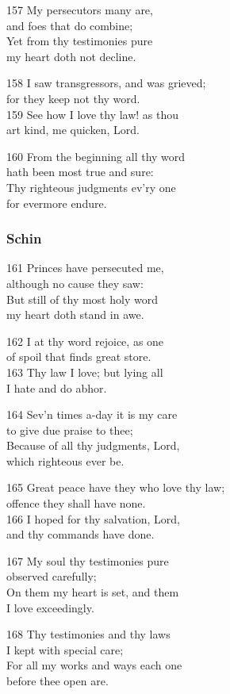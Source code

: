 157 My persecutors many are,\\
and foes that do combine;\\
Yet from thy testimonies pure\\
my heart doth not decline.

158 I saw transgressors, and was grieved;\\
for they keep not thy word.\\
159 See how I love thy law! as thou\\
art kind, me quicken, Lord.

160 From the beginning all thy word\\
hath been most true and sure:\\
Thy righteous judgments ev’ry one\\
for evermore endure.

\subsubsection*{Schin}

161 Princes have persecuted me,\\
although no cause they saw:\\
But still of thy most holy word\\
my heart doth stand in awe.

162 I at thy word rejoice, as one\\
of spoil that finds great store.\\
163 Thy law I love; but lying all\\
I hate and do abhor.

164 Sev’n times a-day it is my care\\
to give due praise to thee;\\
Because of all thy judgments, Lord,\\
which righteous ever be.

165 Great peace have they who love thy law;\\
offence they shall have none.\\
166 I hoped for thy salvation, Lord,\\
and thy commands have done.

167 My soul thy testimonies pure\\
observed carefully;\\
On them my heart is set, and them\\
I love exceedingly.

168 Thy testimonies and thy laws\\
I kept with special care;\\
For all my works and ways each one\\
before thee open are.

